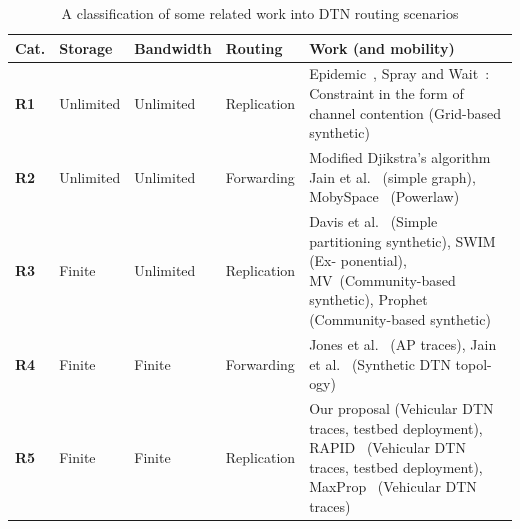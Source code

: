 \begin{table}[!h]
\renewcommand{\arraystretch}{1.1}
\caption{A classification of some related work into DTN routing scenarios}
\centering
\footnotesize
\begin{tabular}{|p{1cm}|p{1.5cm}|p{1.7cm}|p{1.5cm}|p{5cm}|}
\hline
\bfseries Cat. &\bfseries Storage &\bfseries Bandwidth  &\bfseries Routing& \bfseries Work (and mobility)\\
\hline
\bfseries R1&Unlimited & Unlimited &Replication & Epidemic~\cite{Vahdat:epidemic}, Spray and Wait~\cite{akis:wdtn}: Constraint in the form of
channel contention (Grid-based synthetic)\\
\hline
\bfseries R2&Unlimited & Unlimited &Forwarding & Modified Djikstra's algorithm Jain et al.~\cite{Fall:DTNrouting} (simple graph),
MobySpace~\cite{DTNSpace} (Powerlaw)\\
\hline
\bfseries R3&Finite & Unlimited &Replication &Davis et al.~\cite{Wearable} (Simple partitioning synthetic), SWIM~\cite{Haas:wdtn} (Ex-
ponential), MV~\cite{MVRouting}(Community-based synthetic), Prophet~\cite{prophet03}
(Community-based synthetic) \\
\hline
\bfseries R4&Finite & Finite & Forwarding& Jones et al.~\cite{Waterloo:wdtn} (AP traces), Jain et al.~\cite{Fall:DTNrouting} (Synthetic DTN topol-
ogy)\\
\hline
\bfseries R5&Finite & Finite &Replication & Our proposal (Vehicular DTN traces, testbed deployment), RAPID~\cite{Levine:Sigcomm07} (Vehicular DTN traces, testbed deployment), MaxProp~\cite{Levine:MaxProp} (Vehicular DTN traces) \\
\hline
\end{tabular}
\label{RoutingSummary}
\end{table}

